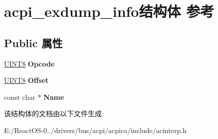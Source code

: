 \hypertarget{structacpi__exdump__info}{}\section{acpi\+\_\+exdump\+\_\+info结构体 参考}
\label{structacpi__exdump__info}
\subsection*{Public 属性}
\begin{DoxyCompactItemize}
\item 
\mbox{\label{structacpi__exdump__info_a37b849d4593a6228493a9bcb32142797}} 
\hyperlink{_processor_bind_8h_ab27e9918b538ce9d8ca692479b375b6a}{U\+I\+N\+T8} {\bfseries Opcode}
\item 
\mbox{\label{structacpi__exdump__info_a1872c7ae90c0ef9981001df8d50d8fbb}} 
\hyperlink{_processor_bind_8h_ab27e9918b538ce9d8ca692479b375b6a}{U\+I\+N\+T8} {\bfseries Offset}
\item 
\mbox{\label{structacpi__exdump__info_a92bae3705bcbe89425b4b024ce70f7f0}} 
const char $\ast$ {\bfseries Name}
\end{DoxyCompactItemize}


该结构体的文档由以下文件生成\+:\begin{DoxyCompactItemize}
\item 
E\+:/\+React\+O\+S-\/0../drivers/bus/acpi/acpica/include/acinterp.\+h\end{DoxyCompactItemize}
